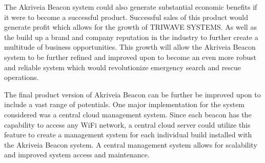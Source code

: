 \bigskip
The Akriveia Beacon system could also generate substantial economic benefits if it were to become a successful product. Successful sales of this product would generate profit which allows for the growth of TRIWAVE SYSTEMS. As well as the build up a brand and company reputation in the industry to further create a multitude of business opportunities. This growth will allow the Akriveia Beacon system to be further refined and improved upon to become an even more robust and reliable system which would revolutionize emergency search and rescue operations.

\bigskip
The final product version of Akriveia Beacon can be further be improved upon to include a vast range of potentials. One major implementation for the system considered was a central cloud management system. Since each beacon has the capability to access any WiFi network, a central cloud server could utilize this feature to create a management system for each individual build installed with the Akriveia Beacon system. A central management system allows for scalability and improved system access and maintenance.




